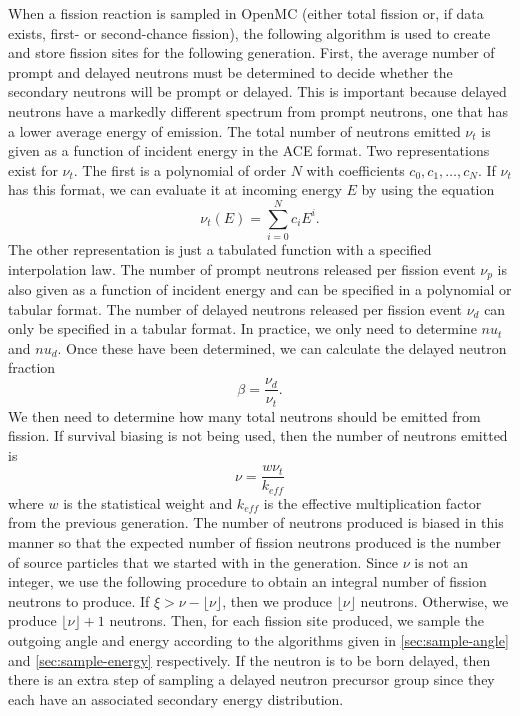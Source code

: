 When a fission reaction is sampled in OpenMC (either total fission or, if data
exists, first- or second-chance fission), the following algorithm is used to
create and store fission sites for the following generation. First, the average
number of prompt and delayed neutrons must be determined to decide whether the
secondary neutrons will be prompt or delayed. This is important because delayed
neutrons have a markedly different spectrum from prompt neutrons, one that has a
lower average energy of emission. The total number of neutrons emitted $\nu_t$
is given as a function of incident energy in the ACE format. Two representations
exist for $\nu_t$. The first is a polynomial of order $N$ with coefficients
$c_0,c_1,\dots,c_N$. If $\nu_t$ has this format, we can evaluate it at incoming
energy $E$ by using the equation
\begin{equation}
  \label{eq:nu-polynomial}
  \nu_t (E) = \sum_{i = 0}^N c_i E^i.
\end{equation}
The other representation is just a tabulated function with a specified
interpolation law. The number of prompt neutrons released per fission event
$\nu_p$ is also given as a function of incident energy and can be specified in a
polynomial or tabular format. The number of delayed neutrons released per
fission event $\nu_d$ can only be specified in a tabular format. In practice, we
only need to determine $nu_t$ and $nu_d$. Once these have been determined, we
can calculate the delayed neutron fraction
\begin{equation}
  \label{eq:beta}
  \beta = \frac{\nu_d}{\nu_t}.
\end{equation}
We then need to determine how many total neutrons should be emitted from
fission. If survival biasing is not being used, then the number of neutrons
emitted is
\begin{equation}
  \label{eq:fission-neutrons}
  \nu = \frac{w \nu_t}{k_{eff}}
\end{equation}
where $w$ is the statistical weight and $k_{eff}$ is the effective
multiplication factor from the previous generation. The number of neutrons
produced is biased in this manner so that the expected number of fission
neutrons produced is the number of source particles that we started with in the
generation. Since $\nu$ is not an integer, we use the following procedure to
obtain an integral number of fission neutrons to produce. If $\xi > \nu -
\lfloor \nu \rfloor$, then we produce $\lfloor \nu \rfloor$ neutrons. Otherwise,
we produce $\lfloor \nu \rfloor + 1$ neutrons. Then, for each fission site
produced, we sample the outgoing angle and energy according to the algorithms
given in \autoref{sec:sample-angle} and \autoref{sec:sample-energy}
respectively. If the neutron is to be born delayed, then there is an extra step
of sampling a delayed neutron precursor group since they each have an associated
secondary energy distribution.

